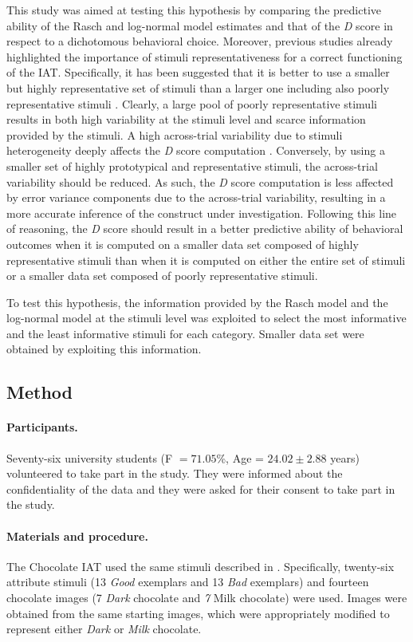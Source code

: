 \documentclass[12pt]{book}
\begin{document}
This study was aimed at testing this hypothesis by comparing the predictive ability of the Rasch and log-normal model estimates and that of the \emph{D} score in respect to a dichotomous behavioral choice. 
Moreover, previous studies already highlighted the importance of stimuli representativeness for a correct functioning of the IAT. Specifically, it has been suggested that it is better to use a smaller but highly representative set of stimuli than a larger one including also poorly representative stimuli \cite{nosek2005}. 
Clearly, a large pool of poorly representative stimuli results in both high variability at the stimuli level and scarce information provided by the stimuli. 
A high across-trial variability due to stimuli heterogeneity deeply affects the \emph{D} score computation \cite{wols2017}. 
Conversely, by using a smaller set of highly prototypical and representative stimuli, the across-trial variability should be reduced. As such, the \emph{D} score computation is less affected by error variance components due to the across-trial variability, resulting in a more accurate inference of the construct under investigation.
Following this line of reasoning, the \emph{D} score should result in a better predictive ability of behavioral outcomes when it is computed on a smaller data set composed of highly representative stimuli than when it is computed on either the entire set of stimuli or a smaller data set composed of poorly representative stimuli.

To test this hypothesis, the information provided by the Rasch model and the log-normal model at the stimuli level  was exploited to select the most informative and the least informative stimuli for each category. Smaller data set were obtained by exploiting this information. 


\subsection{Method}

\paragraph{Participants.}
Seventy-six university students (F $=71.05$\%, Age = $24.02\pm2.88$ years) volunteered to take part in the study. 
They were informed about the confidentiality of the data and they were asked for their consent to take part in the study. 


\paragraph{Materials and procedure.}
The Chocolate IAT used the same stimuli described in . Specifically, twenty-six attribute stimuli (13 \emph{Good} exemplars and 13 \emph{Bad} exemplars) and fourteen chocolate images (7 \emph{Dark} chocolate and \emph{7} Milk chocolate) were used. Images were obtained from the same starting images, which were appropriately modified to represent either \emph{Dark} or \emph{Milk} chocolate.
\end{document}
